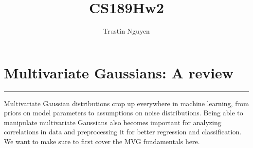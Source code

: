 \documentclass{article}
\title{CS189Hw2}
\author{Trustin Nguyen}
\begin{document}
    \maketitle

\reversemarginpar

\section*{Multivariate Gaussians: A review}
\hrule

Multivariate Gaussian distributions crop up everywhere in machine learning, from priors on model parameters to assumptions on noise distributions. Being able to manipulate multivariate Gaussians also becomes important for analyzing correlations in data and preprocessing it for better regression and classification. We want to make sure to first cover the MVG fundamentals here.
\end{document}
